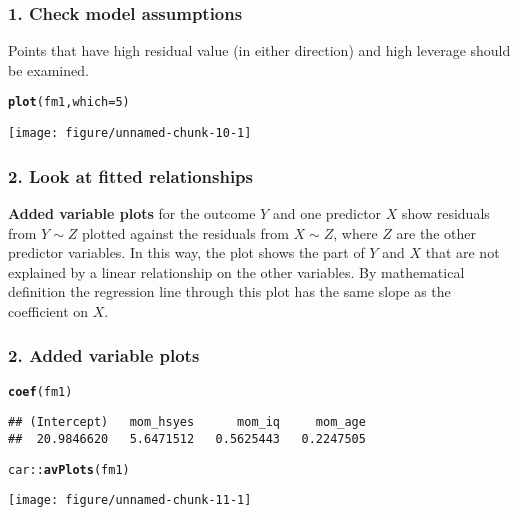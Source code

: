\documentclass[table]{beamer}\usepackage[]{graphicx}\usepackage[]{color}
\makeatletter
\def\maxwidth{ %
  \ifdim\Gin@nat@width>\linewidth
    \linewidth
  \else
    \Gin@nat@width
  \fi
}
\newcommand{\hlnum}[1]{\textcolor[rgb]{0.686,0.059,0.569}{#1}}%
\newcommand{\hlopt}[1]{\textcolor[rgb]{0,0,0}{#1}}%
\newcommand{\hlstd}[1]{\textcolor[rgb]{0.345,0.345,0.345}{#1}}%
\newcommand{\hlkwc}[1]{\textcolor[rgb]{0.333,0.667,0.333}{#1}}%
\newcommand{\hlkwd}[1]{\textcolor[rgb]{0.737,0.353,0.396}{\textbf{#1}}}%
\newenvironment{kframe}{%
 \def\at@end@of@kframe{}%
 \ifinner\ifhmode%
  \def\at@end@of@kframe{\end{minipage}}%
  \begin{minipage}{\columnwidth}%
 \fi\fi%
 \def\FrameCommand##1{\hskip\@totalleftmargin \hskip-\fboxsep
 \colorbox{shadecolor}{##1}\hskip-\fboxsep
     \hskip-\linewidth \hskip-\@totalleftmargin \hskip\columnwidth}%
 \MakeFramed {\advance\hsize-\width
   \@totalleftmargin\z@ \linewidth\hsize
   \@setminipage}}%
 {\par\unskip\endMakeFramed%
 \at@end@of@kframe}
\newenvironment{knitrout}{}{} %
\makeatother
\begin{document}


\begin{frame}[fragile]
\frametitle{1. Check model assumptions}

Points that have high residual value (in either direction) and high leverage should be examined.
\begin{knitrout}
\color{fgcolor}\begin{kframe}
\begin{alltt}
\hlkwd{plot}\hlstd{(fm1,} \hlkwc{which} \hlstd{=} \hlnum{5}\hlstd{)}
\end{alltt}
\end{kframe}
\texttt{[image: figure/unnamed-chunk-10-1]} 
\end{knitrout}

\end{frame}




\begin{frame}[fragile]
\frametitle{2. Look at fitted relationships}

{\bf Added variable plots} for the outcome $Y$ and one predictor $X$ show residuals from $Y\sim Z$ plotted against the residuals from $X\sim Z$, where $Z$ are the other predictor variables. In this way, the plot shows the part of $Y$ and $X$ that are not explained by a linear relationship on the other variables. By mathematical definition the regression line through this plot has the same slope as the coefficient on $X$.


\end{frame}



\begin{frame}[fragile]
\frametitle{2. Added variable plots}

\scriptsize
\begin{knitrout}
\color{fgcolor}\begin{kframe}
\begin{alltt}
\hlkwd{coef}\hlstd{(fm1)}
\end{alltt}
\begin{verbatim}
## (Intercept)   mom_hsyes      mom_iq     mom_age 
##  20.9846620   5.6471512   0.5625443   0.2247505
\end{verbatim}
\begin{alltt}
\hlstd{car}\hlopt{::}\hlkwd{avPlots}\hlstd{(fm1)}
\end{alltt}
\end{kframe}
\texttt{[image: figure/unnamed-chunk-11-1]} 
\end{knitrout}

\end{frame}
\end{document}
